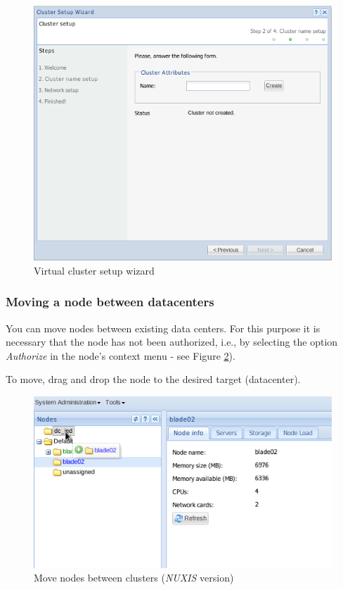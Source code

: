 {\begin{figure}[H]
        \begin{center}
        \includegraphics[scale=0.6]{screenshots/cluster_config.png}
        \caption{Virtual cluster setup wizard}
        \label{fig:cluster_config}
        \end{center}
\end{figure}

\subsubsection{Moving a node between datacenters}
You can move nodes between existing data centers. For this purpose it is necessary that the node has not been authorized, i.e., by selecting the option \emph{Authorize} in the node's context menu - see Figure \ref{fig:cluster-move}).

To move, drag and drop the node to the desired target (datacenter).
\begin{figure}[H]
        \begin{center}
        \includegraphics[scale=0.6]{screenshots/cluster-move.png}
        \caption{Move nodes between clusters (\emph{NUXIS} version)}
        \label{fig:cluster-move}
        \end{center}
\end{figure}

}
